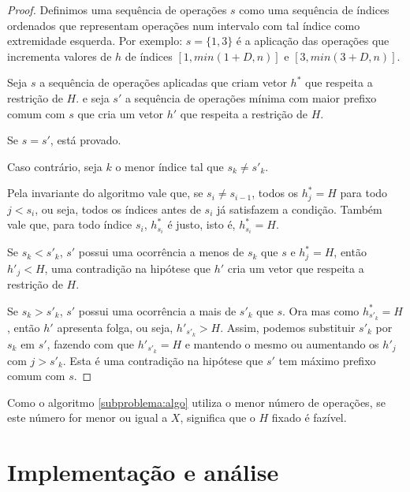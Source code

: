 \begin{proof}
    Definimos uma sequência de operações $s$ como uma sequência de índices ordenados que representam operações num intervalo com tal índice como extremidade esquerda. Por exemplo: $s = \{1, 3\}$ é a aplicação das operações que incrementa valores de $h$ de índices $[1, min(1 + D, n)]$ e $[3, min(3 + D, n)]$.
    
    Seja $s$ a sequência de operações aplicadas que criam vetor $h^*$ que respeita a restrição de $H$. e seja $s'$ a sequência de operações mínima com maior prefixo comum com $s$ que cria um vetor $h'$ que respeita a restrição de $H$.
    
    Se $s = s'$, está provado.

    Caso contrário, seja $k$ o menor índice tal que $s_k \neq s'_k$.

    Pela invariante do algoritmo vale que, se $s_i \neq s_{i - 1}$, todos os $h^*_j = H$ para todo $j < s_i$, ou seja, todos os índices antes de $s_i$ já satisfazem a condição. Também vale que, para todo índice $s_i$, $h^*_{s_i}$ é justo, isto é, $h^*_{s_i} = H$.

    Se $s_k < s'_k$, $s'$ possui uma ocorrência a menos de $s_k$ que $s$ e $h^*_j = H$, então $h'_j < H$, uma contradição na hipótese que $h'$ cria um vetor que respeita a restrição de $H$.

    Se $s_k > s'_k$, $s'$ possui uma ocorrência a mais de $s'_k$ que $s$. Ora mas como $h^*_{s'_k} = H$, então $h'$ apresenta folga, ou seja, $h'_{s'_k} > H$. Assim, podemos substituir $s'_k$ por $s_k$ em $s'$, fazendo com que $h'_{s'_k} = H$ e mantendo o mesmo ou aumentando os $h'_j$ com $j > s'_k$. Esta é uma contradição na hipótese que $s'$ tem máximo prefixo comum com $s$.

\end{proof}

Como o algoritmo \ref{subproblema:algo} utiliza o menor número de operações, se este número for menor ou igual a $X$, significa que o $H$ fixado é fazível.

\section{Implementação e análise}

